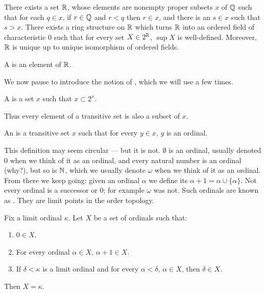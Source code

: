 \begin{theorem}[Dedekind]
There exists a set $\mathbb{R}$, whose elements are nonempty proper subsets $x$ of $\mathbb{Q}$ such that for each $q \in x$, if $r \in \mathbb{Q}$ and $r < q$ then $r \in x$, and there is an $s \in x$ such that $s > x$.
There exists a ring structure on $\mathbb{R}$ which turns $\mathbb{R}$ into an ordered field of characteristic $0$ such that for every set $X \in 2^{\mathbb{R}}$, $\sup X$ is well-defined.
Moreover, $\mathbb{R}$ is unique up to unique isomorphism of ordered fields.
\end{theorem}

\begin{definition}
A  is an element of $\mathbb{R}$.
\end{definition}

\begin{subsec}
We now pause to introduce the notion of , which we will use a few times.
\end{subsec}

\begin{definition}
A  is a set $x$ such that $x \subset 2^x$.
\end{definition}

\begin{subsec}
Thus every element of a transitive set is also a subset of $x$.
\end{subsec}

\begin{definition}\label{ordinal dfn}
An  is a transitive set $x$ such that for every $y \in x$, $y$ is an ordinal.
\end{definition}

\begin{subsec}
This definition may seem circular --- but it is not. $\emptyset$ is an ordinal, usually denoted $0$ when we think of it as an ordinal, and every natural number is an ordinal (why?), but so is $\mathbb{N}$, which we usually denote $\omega$ when we think of it as an ordinal.
From there we keep going: given an ordinal $\alpha$ we define its  $\alpha + 1 = \alpha \cup \{\alpha\}$.
Not every ordinal is a successor or $0$; for example $\omega$ was not. Such ordinals are known as .
They are limit points in the order topology.
\end{subsec}

\begin{theorem}\label{transfinite induction}
Fix a limit ordinal $\kappa$. Let $X$ be a set of ordinals such that:
\begin{enumerate}
\item $0 \in X$.
\item For every ordinal $\alpha \in X$, $\alpha + 1 \in X$.
\item If $\delta < \kappa$ is a limit ordinal and for every $\alpha < \delta$, $\alpha \in X$, then $\delta \in X$.
\end{enumerate}
Then $X = \kappa$.
\end{theorem}

